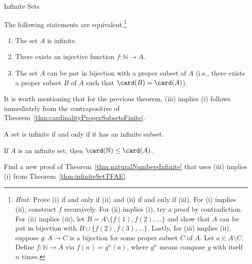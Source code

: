 \begin{section}{Infinite Sets}
\begin{theorem}\label{thm:infiniteSetTFAE}
The following statements are equivalent.\footnote{\emph{Hint:} Prove (i) if and only if (ii) and (ii) if and only if (iii). For (i) implies (ii), construct $f$ recursively. For (ii) implies (i), try a proof by contradiction. For (ii) implies (iii), let $B=A\setminus \{f(1),f(2),\ldots\}$ and show that $A$ can be put in bijection with $B\cup\{f(2),f(3),\ldots\}$. Lastly, for (iii) implies (ii), suppose $g:A\to C$ is a bijection for some proper subset $C$ of $A$. Let $a\in A\setminus C$. Define $f:\mathbb{N}\to A$ via $f(n)=g^n(a)$, where $g^n$ means compose $g$ with itself $n$ times.}
\begin{enumerate}[label=\textrm{(\roman*)}]
\item The set $A$ is infinite.
\item There exists an injective function $f:\mathbb{N}\to A$.
\item The set $A$ can be put in bijection with a proper subset of $A$ (i.e., there exists a proper subset $B$ of $A$ such that $\card(B)=\card(A)$).
\end{enumerate}
\end{theorem}

It is worth mentioning that for the previous theorem, (iii) implies (i) follows immediately from the contrapositive of Theorem~\ref{thm:cardinalityProperSubsetsFinite}.

\begin{corollary}\label{cor:infiniteSetInfiniteSubset}
A set is infinite if and only if it has an infinite subset.
\end{corollary}

\begin{corollary}
If $A$ is an infinite set, then $\card(\mathbb{N})\leq \card(A)$.
\end{corollary}

\begin{problem}
Find a new proof of Theorem~\ref{thm:naturalNumbersInfinite} that uses (iii) implies (i) from Theorem~\ref{thm:infiniteSetTFAE}.
\end{problem}


\end{section}
